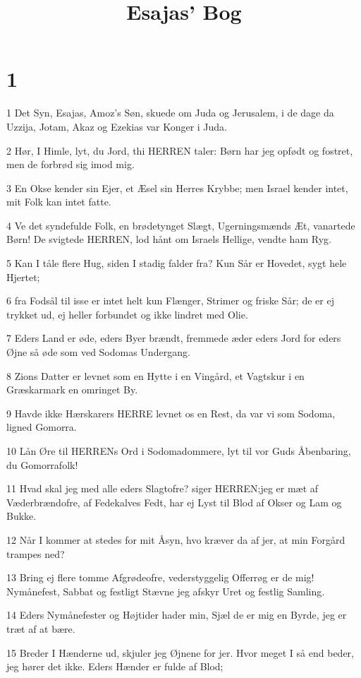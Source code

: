 

\title{Esajas' Bog}


\chapter{1}

\par 1 Det Syn, Esajas, Amoz's Søn, skuede om Juda og Jerusalem, i de dage da Uzzija, Jotam, Akaz og Ezekias var Konger i Juda.
\par 2 Hør, I Himle, lyt, du Jord, thi HERREN taler: Børn har jeg opfødt og fostret, men de forbrød sig imod mig.
\par 3 En Okse kender sin Ejer, et Æsel sin Herres Krybbe; men Israel kender intet, mit Folk kan intet fatte.
\par 4 Ve det syndefulde Folk, en brødetynget Slægt, Ugerningsmænds Æt, vanartede Børn! De svigtede HERREN, lod hånt om Israels Hellige, vendte ham Ryg.
\par 5 Kan I tåle flere Hug, siden I stadig falder fra? Kun Sår er Hovedet, sygt hele Hjertet;
\par 6 fra Fodsål til isse er intet helt kun Flænger, Strimer og friske Sår; de er ej trykket ud, ej heller forbundet og ikke lindret med Olie.
\par 7 Eders Land er øde, eders Byer brændt, fremmede æder eders Jord for eders Øjne så øde som ved Sodomas Undergang.
\par 8 Zions Datter er levnet som en Hytte i en Vingård, et Vagtskur i en Græskarmark en omringet By.
\par 9 Havde ikke Hærskarers HERRE levnet os en Rest, da var vi som Sodoma, ligned Gomorra.
\par 10 Lån Øre til HERRENs Ord i Sodomadommere, lyt til vor Guds Åbenbaring, du Gomorrafolk!
\par 11 Hvad skal jeg med alle eders Slagtofre? siger HERREN;jeg er mæt af Væderbrændofre, af Fedekalves Fedt, har ej Lyst til Blod af Okser og Lam og Bukke.
\par 12 Når I kommer at stedes for mit Åsyn, hvo kræver da af jer, at min Forgård trampes ned?
\par 13 Bring ej flere tomme Afgrødeofre, vederstyggelig Offerrøg er de mig! Nymånefest, Sabbat og festligt Stævne jeg afskyr Uret og festlig Samling.
\par 14 Eders Nymånefester og Højtider hader min, Sjæl de er mig en Byrde, jeg er træt af at bære.
\par 15 Breder I Hænderne ud, skjuler jeg Øjnene for jer. Hvor meget I så end beder, jeg hører det ikke. Eders Hænder er fulde af Blod;
